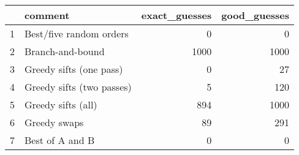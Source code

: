 \begin{table}[ht]
\centering
\begin{tabular}{rlrr}
  \hline
 & comment & exact\_guesses & good\_guesses \\ 
  \hline
1 & Best/five random orders &   0 &   0 \\ 
  2 & Branch-and-bound & 1000 & 1000 \\ 
  3 & Greedy sifts (one pass) &   0 &  27 \\ 
  4 & Greedy sifts (two passes) &   5 & 120 \\ 
  5 & Greedy sifts (all) & 894 & 1000 \\ 
  6 & Greedy swaps &  89 & 291 \\ 
  7 & Best of A and B &   0 &   0 \\ 
   \hline
\end{tabular}
\end{table}
